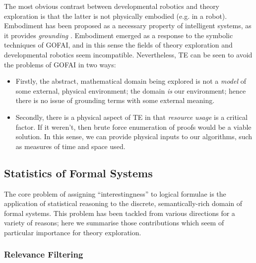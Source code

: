 \documentclass[]{article}
\begin{document}
The most obvious contrast between developmental robotics and theory exploration is that the latter is not physically embodied (e.g. in a robot). Embodiment has been proposed as a necessary property of intelligent systems, as it provides \emph{grounding} \cite{anderson2003embodied}. Embodiment emerged as a response to the symbolic techniques of GOFAI, and in this sense the fields of theory exploration and developmental robotics seem incompatible. Nevertheless, TE can be seen to avoid the problems of GOFAI in two ways:

\begin{itemize}

  \item Firstly, the abstract, mathematical domain being explored is not a \emph{model} of some external, physical environment; the domain \emph{is} our environment; hence there is no issue of grounding terms with some external meaning.

  \item Secondly, there is a physical aspect of TE in that \emph{resource usage} is a critical factor. If it weren't, then brute force enumeration of proofs would be a viable solution. In this sense, we can provide physical inputs to our algorithms, such as measures of time and space used.

\end{itemize}

\iffalse

\subsubsection{Universal Drives}

PhysRevLett.110.168702.pdf
Omohundro? Too physical.
\emph{Universal drives} are those

\fi

\subsection{Statistics of Formal Systems}

The core problem of assigning ``interestingness'' to logical formulae is the application of statistical reasoning to the discrete, semantically-rich domain of formal systems. This problem has been tackled from various directions for a variety of reasons; here we summarise those contributions which seem of particular importance for theory exploration.

\subsubsection{Relevance Filtering}
\label{relevance}
\end{document}
